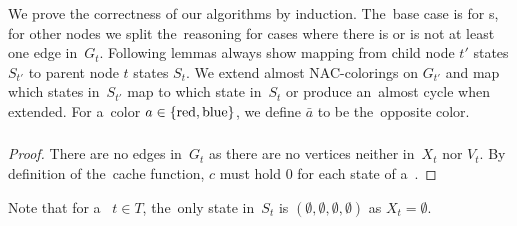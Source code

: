 We prove the correctness of our algorithms by induction.
The~base case is for \LeafNode{}s, for other nodes we split the~reasoning for cases where
there is or is not at least one edge in~\( G_t \).
%
Following lemmas always show mapping from child node \( t' \) states \( S_{t'} \)
to parent node \( t \) states \( S_t \).
We extend almost NAC-colorings on \( G_{t'} \) and
map which states in~\( S_{t'} \) map to which state in~\( S_t \)
or produce an~almost cycle when extended.
%
For a~color \( a \in \{\text{red}, \text{blue}\} \),
we define \( \bar{a} \) to be the~opposite color.

\subsubsection*{\LeafNode{}}

%
\begin{proof}
	There are no edges in~\( G_t \) as there are no vertices
	neither in~\( X_t \) nor \( V_t \).
	By definition of the~cache function,
	\( c \) must hold \( 0 \) for each state of a~\LeafNode{}.
\end{proof}
%
Note that for a~\LeafNode{} \( t \in T \),
the~only state in~\( S_t \) is \( (\emptyset, \emptyset, \emptyset, \emptyset) \)
as \( X_t = \emptyset \).

\subsubsection*{\IntroduceVertexNode{}}

